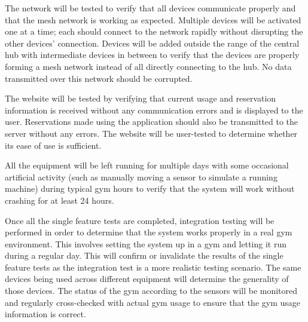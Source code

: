 \documentclass[PPFS.tex]{template/subfiles}
\begin{document}
The network will be tested to verify that all devices communicate properly and that the mesh network is working as expected. Multiple devices will be activated one at a time; each should connect to the network rapidly without disrupting the other devices' connection. Devices will be added outside the range of the central hub with intermediate devices in between to verify that the devices are properly forming a mesh network instead of all directly connecting to the hub. No data transmitted over this network should be corrupted.

The website will be tested by verifying that current usage and reservation information is received without any communication errors and is displayed to the user. Reservations made using the application should also be transmitted to the server without any errors. The website will be user-tested to determine whether its ease of use is sufficient.

All the equipment will be left running for multiple days with some occasional artificial activity (such as manually moving a sensor to simulate a running machine) during typical gym hours to verify that the system will work without crashing for at least 24 hours.

Once all the single feature tests are completed, integration testing will be performed in order to determine that the system works properly in a real gym environment. This involves setting the system up in a gym and letting it run during a regular day. This will confirm or invalidate the results of the single feature tests as the integration test is a more realistic testing scenario. The same devices being used across different equipment will determine the generality of those devices. The status of the gym according to the sensors will be monitored and regularly cross-checked with actual gym usage to ensure that the gym usage information is correct.
\end{document}
